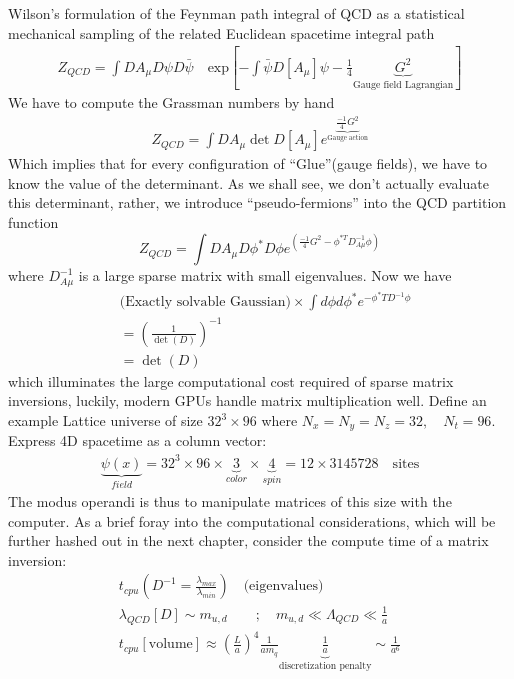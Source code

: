 Wilson's formulation of the Feynman path integral of QCD as a statistical mechanical sampling of the related Euclidean spacetime integral path 
\begin{align}
    Z_{QCD} = \int DA_\mu D\psi D\bar{\psi} \quad \text{exp}\left[-\int \bar{\psi}D[A_\mu]\psi - \frac{1}{4}\underbrace{G^2}_{\text{Gauge field Lagrangian}}\right]
\end{align}
We have to compute the Grassman numbers by hand 
\begin{align}
    Z_{QCD} = \int DA_\mu \det D[A_\mu]e^{\underbrace{\frac{-1}{4}G^2}_{\text{Gauge action}}}
\end{align}
Which implies that for every configuration of ``Glue''(gauge fields), we have to know the value of the determinant. As we shall see, we don't actually evaluate this determinant, rather, we introduce ``pseudo-fermions'' into the QCD partition function 
\begin{equation}
    Z_{QCD} = \int DA_\mu D\phi^* D\phi e^{\left(\frac{-1}{4}G^2 - \phi^{*T}D_{A\mu}^{-1}\phi\right)}
\end{equation} where $D_{A\mu}^{-1}$ is a large sparse matrix with small eigenvalues. Now we have 
\begin{align}
    & \text{(Exactly solvable Gaussian)} \times \int d\phi d\phi^* e^{-\phi^*T D^{-1}\phi} \\ 
    &= \left(\frac{1}{\det(D)}\right)^{-1} \\
    &= \det(D)
\end{align}
which illuminates the large computational cost required of sparse matrix inversions, luckily, modern GPUs handle matrix multiplication well. Define an example Lattice universe of size $32^3 \times 96$ where $N_x=N_y=N_z = 32, \quad N_t=96$. Express 4D spacetime as a column vector: 
\begin{align}
   \underbrace{\psi(x)}_{field} = 32^3 \times 96 \times \underbrace{3}_{color} \times \underbrace{4}_{spin} = 12 \times 3145728 \quad \text{sites} 
\end{align}
The modus operandi is thus to manipulate matrices of this size with the computer. 
As a brief foray into the computational considerations, which will be further hashed out in the next chapter, consider the compute time of a matrix inversion: 
\begin{align}
    t_{cpu}\left(D^{-1} = \frac{\lambda_{max}}{\lambda_{min}}\right) \quad \text{(eigenvalues)} \\ 
    \lambda_{QCD}[D] \sim m_{u,d} \qquad ;\quad  m_{u,d} \ll \Lambda_{QCD} \ll \frac{1}{a} \\
    t_{cpu}[\text{volume}] \approx \left(\frac{L}{a}\right)^4 \frac{1}{am_q} \underbrace{\frac{1}{a}}_{\text{discretization penalty}} \sim \frac{1}{a^6}
\end{align}  
